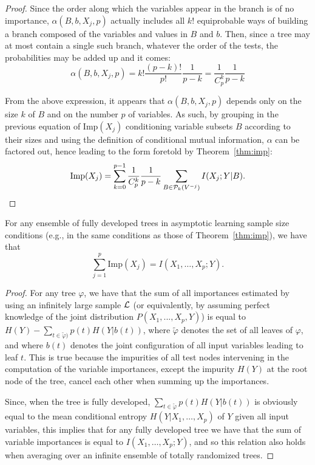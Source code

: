 \begin{proof}
Since the order along which the variables appear in the branch is of no
importance, $\alpha(B,b,X_j,p)$ actually includes all $k!$ equiprobable ways of
building a branch composed of the variables and values in $B$ and $b$. Then,
since a tree may at most contain a single such branch, whatever the order of the
tests, the probabilities may be added up and it comes:
\begin{equation}
\alpha(B,b,X_j,p)=k! \frac{(p-k)!}{p!} \frac{1}{p-k} = \frac{1}{C_p^k} \frac{1}{p-k}
\end{equation}

From the above expression, it appears that $\alpha(B,b,X_j,p)$ depends only on
the size $k$ of $B$ and on the number $p$ of variables. As such, by grouping in
the previous equation of $\text{Imp}(X_j)$ conditioning variable subsets $B$ according
to their sizes and using the definition of conditional mutual information,
$\alpha$ can be factored out, hence leading to the form foretold by Theorem~\ref{thm:imp}:
\begin{equation}
\text{Imp}(X_j)=\sum_{k=0}^{p-1} \frac{1}{C^k_p} \frac{1}{p-k} \sum_{B \in {\cal P}_k(V^{-j})} I(X_j;Y|B).
\end{equation}
\end{proof}

\begin{theorem}\label{thm:sum-of-imp}
For any ensemble of fully developed trees in asymptotic learning sample size
conditions (e.g., in the same conditions as those of Theorem~\ref{thm:imp}), we
have that
\begin{equation}\label{eqn:sum-of-imp}
\sum_{j=1}^{p} \text{Imp}(X_j) = I(X_{1}, \ldots, X_{p} ; Y).
\end{equation}
\end{theorem}

\begin{proof}
For any tree $\varphi$, we have that the sum of all importances estimated by
using an infinitely large sample $\cal L$ (or equivalently, by assuming perfect
knowledge of the joint distribution $P(X_1, ..., X_p, Y)$) is equal to $H(Y) -
\sum_{t \in \widetilde{\varphi})} p(t) H(Y|b(t))$, where $\widetilde{\varphi}$
denotes the set of all leaves of $\varphi$, and where $b(t)$  denotes the joint
configuration of all input variables leading to leaf $t$. This is true because
the impurities of all test nodes intervening in the computation of the variable
importances, except the impurity $H(Y)$ at the root node of the tree, cancel
each other when summing up the importances.

Since, when the tree is fully developed, $\sum_{t \in \widetilde{\varphi}} p(t)
H(Y|b(t))$ is obviously equal to the mean conditional entropy $H(Y | X_{1},
\ldots, X_{p})$ of $Y$ given all input variables, this implies that for any
fully developed tree we have that the sum of variable importances is equal to
$I(X_{1}, \ldots, X_{p} ; Y)$, and so this relation also holds when averaging
over an infinite ensemble of totally randomized trees.
\end{proof}

